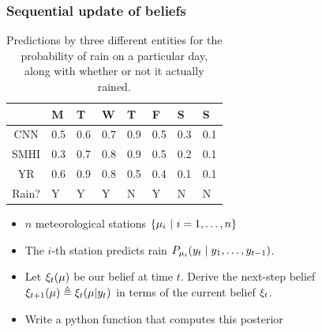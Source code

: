 \begin{frame}
  \frametitle{Sequential update of beliefs}
    {
      \begin{table}[h]
        \begin{tabular}{c|l|l|l|l|l|l|l}
          &M&T&W&T&F&S&S\\
          \hline
          CNN & 0.5 & 0.6 & 0.7 & 0.9 & 0.5 & 0.3 & 0.1\\
          SMHI & 0.3 & 0.7 & 0.8 & 0.9 & 0.5 & 0.2 & 0.1\\
          YR & 0.6 & 0.9 & 0.8 & 0.5 & 0.4 & 0.1 & 0.1\\
          \hline
          Rain? & Y & Y & Y & N & Y & N & N
        \end{tabular}
        \caption{Predictions by three different entities for the probability of rain on a particular day, along with whether or not it actually rained.}
        \label{tab:meteorologists}
      \end{table}
    }
  \begin{exercise}
    \begin{itemize}
    \item $n$ meteorological stations $\left\{\mu_i ~\middle|~ i=1, \ldots,n\right\}$
    \item The $i$-th station predicts rain $P_{\mu_i}(y_t \mid y_1, \ldots, y_{t-1})$.
    \item Let $\xi_t(\mu)$ be our belief at time $t$.
      Derive the next-step belief
      $\xi_{t+1}(\mu) \mathrel{\triangleq}  \xi_t(\mu | y_{t})$ in terms of the current belief $\xi_t$.
    \item Write a python function that computes this posterior
    \end{itemize}
  \end{exercise}
\end{frame}



